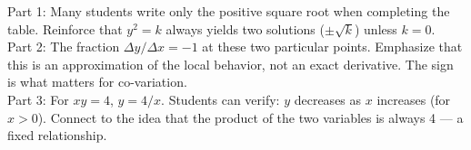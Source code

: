 \documentclass[10pt]{article}
\begin{document}
\begin{teachernote}
Part 1: Many students write only the positive square root when completing the table. Reinforce that $y^2 = k$ always yields two solutions ($\pm\sqrt{k}$) unless $k = 0$.\\[3pt]
Part 2: The fraction $\Delta y/\Delta x = -1$ at these two particular points. Emphasize that this is an approximation of the local behavior, not an exact derivative. The sign is what matters for co-variation.\\[3pt]
Part 3: For $xy = 4$, $y = 4/x$. Students can verify: $y$ decreases as $x$ increases (for $x > 0$). Connect to the idea that the product of the two variables is always 4 --- a fixed relationship.
\end{teachernote}
\end{document}
